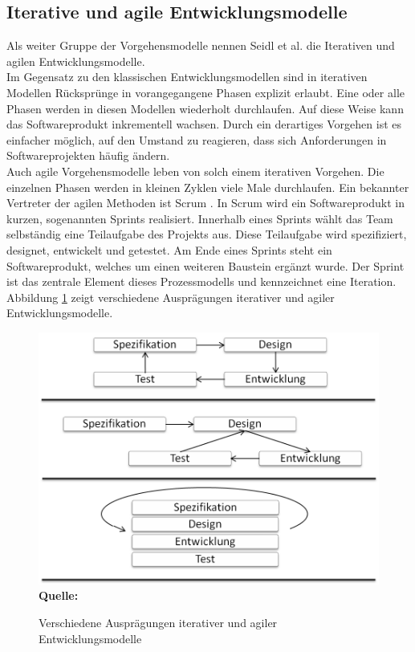 \subsection{Iterative und agile Entwicklungsmodelle}
\label{subsec:iterative_und_agile_entwicklungsmodelle}
Als weiter Gruppe der Vorgehensmodelle nennen Seidl et al. \cite[vgl. S.23 ff.]{seidl_basiswissen_2012} die Iterativen und agilen Entwicklungsmodelle.\\
Im Gegensatz zu den klassischen Entwicklungsmodellen sind in iterativen Modellen Rücksprünge in vorangegangene Phasen explizit erlaubt. Eine oder alle Phasen werden in diesen Modellen wiederholt durchlaufen. Auf diese Weise kann das Softwareprodukt inkrementell wachsen. Durch ein derartiges Vorgehen ist es einfacher möglich, auf den Umstand zu reagieren, dass sich Anforderungen in Softwareprojekten häufig ändern. \\
Auch agile Vorgehensmodelle leben von solch einem iterativen Vorgehen. Die einzelnen Phasen werden in kleinen Zyklen viele Male durchlaufen.
Ein bekannter Vertreter der agilen Methoden ist Scrum \cite{schwaber_agile_2002}. In Scrum wird ein Softwareprodukt in kurzen, sogenannten Sprints realisiert. Innerhalb eines Sprints wählt das Team selbständig eine Teilaufgabe des Projekts aus. Diese Teilaufgabe wird spezifiziert, designet, entwickelt und getestet. Am Ende eines Sprints steht ein Softwareprodukt, welches um einen weiteren Baustein ergänzt wurde.
Der Sprint ist das zentrale Element dieses Prozessmodells und kennzeichnet eine Iteration.
Abbildung \ref{fig:verschiedene_auspraegungen_iterativer_und_agiler_entwicklungsmodelle} zeigt verschiedene Ausprägungen iterativer und agiler Entwicklungsmodelle.\\
\begin{figure}[htb]
  \centering  
  \includegraphics[scale=0.8]{img/iterativeentwicklungsmodelle.png}\\
  \footnotesize\sffamily\textbf{Quelle:} \cite[vgl. S.24]{seidl_basiswissen_2012}
  \caption{Verschiedene Ausprägungen iterativer und agiler Entwicklungsmodelle}
  \label{fig:verschiedene_auspraegungen_iterativer_und_agiler_entwicklungsmodelle}
\end{figure}
